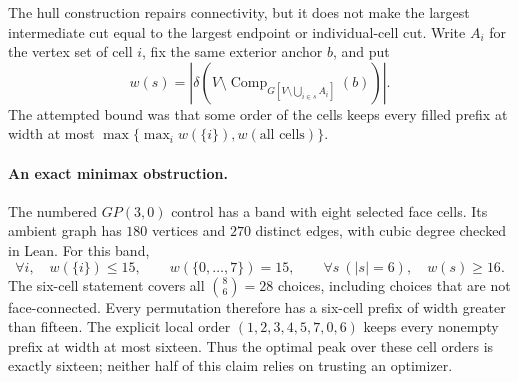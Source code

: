 The hull construction repairs connectivity, but it does not make the
largest intermediate cut equal to the largest endpoint or individual-cell
cut. Write $A_i$ for the vertex set of cell $i$, fix the same exterior
anchor $b$, and put
\[
 w(s)=\left|\delta\left(V\setminus
   \operatorname{Comp}_{G[V\setminus\bigcup_{i\in s}A_i]}(b)\right)\right|.
\]
The attempted bound was that some order of the cells keeps every filled
prefix at width at most
$\max\{\max_i w(\{i\}),w(\text{all cells})\}$.

\paragraph{An exact minimax obstruction.}
The numbered $GP(3,0)$ control has a band with eight selected face cells.
Its ambient graph has $180$ vertices and $270$ distinct edges, with cubic
degree checked in Lean.
For this band,
\[
 \forall i,\quad w(\{i\})\le15,\qquad
 w(\{0,\ldots,7\})=15,\qquad
 \forall s\ (|s|=6),\quad w(s)\ge16.
\]
The six-cell statement covers all $\binom86=28$ choices, including choices
that are not face-connected. Every permutation therefore has a six-cell
prefix of width greater than fifteen.
The explicit local order $(1,2,3,4,5,7,0,6)$ keeps every nonempty prefix
at width at most sixteen. Thus the optimal peak over these cell orders is
exactly sixteen; neither half of this claim relies on trusting an optimizer.

